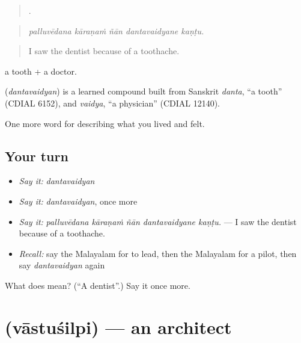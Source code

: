 \begin{quote}
    .
\end{quote}

\begin{quote}
\emph{palluvēdana kāraṇaṁ ñān dantavaidyane kaṇṭu.}
\end{quote}

\begin{quote}
I saw the dentist because of a toothache.
\end{quote}

 a tooth +  a doctor.

\begin{cousinweb}
\textbf{} (\emph{dantavaidyan}) is a learned compound built from Sanskrit \emph{danta}, \textquotedblleft{}a tooth\textquotedblright{} (CDIAL 6152), and \emph{vaidya}, \textquotedblleft{}a physician\textquotedblright{} (CDIAL 12140).
\end{cousinweb}

\begin{grammarlens}[title={What you've built}]
One more word for describing what you lived and felt.
\end{grammarlens}

\subsection*{Your turn}
\begin{itemize}
\raggedright
  \item \emph{Say it:} \emph{dantavaidyan}
  \item \emph{Say it:} \emph{dantavaidyan}, once more
  \item \emph{Say it:} \emph{palluvēdana kāraṇaṁ ñān dantavaidyane kaṇṭu.} — I saw the dentist because of a toothache.
  \item \emph{Recall:} say the Malayalam for to lead, then the Malayalam for a pilot, then say \emph{dantavaidyan} again
\end{itemize}

\begin{tcolorbox}[breakable,colback=teal!4,colframe=teal!35!black,title={Before you move on}]
What does  mean? (\textquotedblleft{}A dentist\textquotedblright{}.) Say it once more.
\end{tcolorbox}
\section[\texorpdfstring{\ml{വാസ്തുശില്പി} (vāstuśilpi)}{വാസ്തുശില്പി (vāstuśilpi)}]{ (vāstuśilpi) — an architect}

